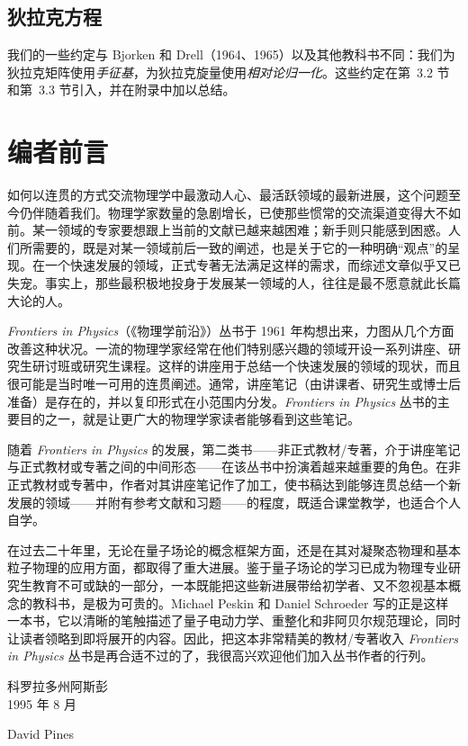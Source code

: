 \section*{狄拉克方程}

我们的一些约定与 Bjorken 和 Drell（1964、1965）以及其他教科书不同：我们为狄拉克矩阵使用\emph{手征基}，为狄拉克旋量使用\emph{相对论归一化}。这些约定在第~3.2 节和第~3.3 节引入，并在附录中加以总结。

\chapter*{编者前言}

如何以连贯的方式交流物理学中最激动人心、最活跃领域的最新进展，这个问题至今仍伴随着我们。物理学家数量的急剧增长，已使那些惯常的交流渠道变得大不如前。某一领域的专家要想跟上当前的文献已越来越困难；新手则只能感到困惑。人们所需要的，既是对某一领域前后一致的阐述，也是关于它的一种明确``观点''的呈现。在一个快速发展的领域，正式专著无法满足这样的需求，而综述文章似乎又已失宠。事实上，那些最积极地投身于发展某一领域的人，往往是最不愿意就此长篇大论的人。

\textit{Frontiers in Physics}（《物理学前沿》）丛书于 1961 年构想出来，力图从几个方面改善这种状况。一流的物理学家经常在他们特别感兴趣的领域开设一系列讲座、研究生研讨班或研究生课程。这样的讲座用于总结一个快速发展的领域的现状，而且很可能是当时唯一可用的连贯阐述。通常，讲座笔记（由讲课者、研究生或博士后准备）是存在的，并以复印形式在小范围内分发。\textit{Frontiers in Physics} 丛书的主要目的之一，就是让更广大的物理学家读者能够看到这些笔记。

随着 \textit{Frontiers in Physics} 的发展，第二类书——非正式教材/专著，介于讲座笔记与正式教材或专著之间的中间形态——在该丛书中扮演着越来越重要的角色。在非正式教材或专著中，作者对其讲座笔记作了加工，使书稿达到能够连贯总结一个新发展的领域——并附有参考文献和习题——的程度，既适合课堂教学，也适合个人自学。

在过去二十年里，无论在量子场论的概念框架方面，还是在其对凝聚态物理和基本粒子物理的应用方面，都取得了重大进展。鉴于量子场论的学习已成为物理专业研究生教育不可或缺的一部分，一本既能把这些新进展带给初学者、又不忽视基本概念的教科书，是极为可贵的。Michael Peskin 和 Daniel Schroeder 写的正是这样一本书，它以清晰的笔触描述了量子电动力学、重整化和非阿贝尔规范理论，同时让读者领略到即将展开的内容。因此，把这本非常精美的教材/专著收入 \textit{Frontiers in Physics} 丛书是再合适不过的了，我很高兴欢迎他们加入丛书作者的行列。

\vspace{2em}
\noindent 科罗拉多州阿斯彭\\
1995 年 8 月

\vspace{1em}
\noindent David Pines
